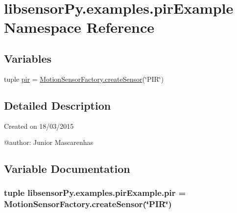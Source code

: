 \hypertarget{namespacelibsensorPy_1_1examples_1_1pirExample}{}\section{libsensor\+Py.\+examples.\+pir\+Example Namespace Reference}
\label{namespacelibsensorPy_1_1examples_1_1pirExample}
\subsection*{Variables}
\begin{DoxyCompactItemize}
\item 
tuple \hyperlink{namespacelibsensorPy_1_1examples_1_1pirExample_acdcd8e5d31617c8a0b8c2501e8561e39}{pir} = \hyperlink{classconcretefactory_1_1motionSensorFactory_1_1MotionSensorFactory_a34e03c8f0321aa4b610df0a504b82834}{Motion\+Sensor\+Factory.\+create\+Sensor}(\char`\"{}P\+I\+R\char`\"{})
\end{DoxyCompactItemize}


\subsection{Detailed Description}
\begin{DoxyVerb}Created on 18/03/2015

@author: Junior Mascarenhas
\end{DoxyVerb}
 

\subsection{Variable Documentation}
\hypertarget{namespacelibsensorPy_1_1examples_1_1pirExample_acdcd8e5d31617c8a0b8c2501e8561e39}{}
\subsubsection[{pir}]{\setlength{\rightskip}{0pt plus 5cm}tuple libsensor\+Py.\+examples.\+pir\+Example.\+pir = {\bf Motion\+Sensor\+Factory.\+create\+Sensor}(\char`\"{}P\+I\+R\char`\"{})}\label{namespacelibsensorPy_1_1examples_1_1pirExample_acdcd8e5d31617c8a0b8c2501e8561e39}
